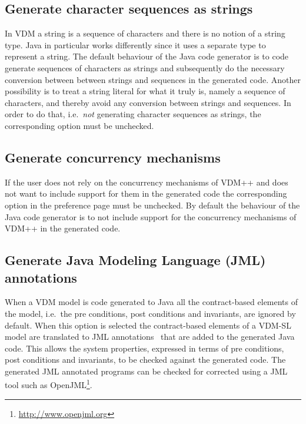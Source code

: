 \subsection{Generate character sequences as strings}
\label{sec:charseqs-as-strings}

In VDM a string is a sequence of characters and there is no notion of
a string type. Java in particular works differently since it uses a
separate type to represent a string. The default behaviour of the Java
code generator is to code generate sequences of characters as strings
and subsequently do the necessary conversion between between strings
and sequences in the generated code. Another possibility is to treat a
string literal for what it truly is, namely a sequence of characters,
and thereby avoid any conversion between strings and sequences. In
order to do that, i.e.\ \textit{not} generating character sequences as
strings, the corresponding option must be unchecked.

\subsection{Generate concurrency mechanisms}

If the user does not rely on the concurrency mechanisms of VDM++ and
does not want to include support for them in the generated code the
corresponding option in the preference page must be unchecked. By
default the behaviour of the Java code generator is to not include
support for the concurrency mechanisms of VDM++ in the generated code.

\subsection{Generate Java Modeling Language (JML) annotations}

When a VDM model is code generated to Java all the contract-based
elements of the model, i.e.\ the pre conditions, post conditions and
invariants, are ignored by default. When this option is selected the
contract-based elements of a VDM-SL model are translated to JML
annotations~\cite{Burdy&05} that are added to the generated Java
code. This allows the system properties, expressed in terms of pre
conditions, post conditions and invariants, to be checked against the
generated code. The generated JML annotated programs can be checked
for corrected using a JML tool such as
OpenJML\footnote{\url{http://www.openjml.org}}.\\

